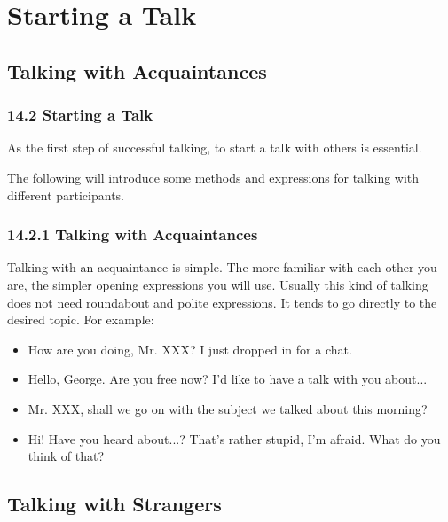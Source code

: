 \documentclass[aspectratio=169,UTF8,c]{beamer}%
\begin{document}
\section{Starting a Talk}

\subsection{Talking with Acquaintances}

\begin{frame}
	\frametitle{14.2 Starting a Talk}
	As the first step of successful talking, to start a talk with others is essential. 
	
	The following will introduce some methods and expressions for talking with different participants.
\end{frame}

\begin{frame}
	\frametitle{14.2.1 Talking with Acquaintances}
	Talking with an acquaintance is simple. The more familiar with each other you are, the simpler opening expressions you will use. Usually this kind of talking does not need roundabout and polite expressions. It tends to go directly to the desired topic. For example:
	\begin{itemize}
		\item How are you doing, Mr. XXX? I just dropped in for a chat.
		\item Hello, George. Are you free now? I'd like to have a talk with you about...
		\item Mr. XXX, shall we go on with the subject we talked about this morning?
		\item Hi! Have you heard about...? That's rather stupid, I'm afraid. What do you think of that?
	\end{itemize}
\end{frame}

\subsection{Talking with Strangers}
\end{document}
